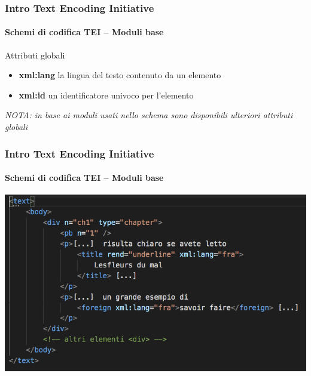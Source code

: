 \begin{frame}
	\frametitle{Intro Text Encoding Initiative}
	\framesubtitle{Schemi di codifica TEI – Moduli base}
	\addtocounter{nframe}{1}

    \begin{block}{ Attributi globali}
        \begin{itemize}
            \item \textbf{xml:lang} la lingua del testo contenuto da un elemento
            \item \textbf{xml:id} un identificatore univoco per l’elemento
        \end{itemize}
       \textit{NOTA: in base ai moduli usati nello schema sono disponibili ulteriori attributi globali}
    \end{block}
\end{frame}

\begin{frame}
	\frametitle{Intro Text Encoding Initiative}
	\framesubtitle{Schemi di codifica TEI – Moduli base}
	\addtocounter{nframe}{1}

	\begin{center}
		\includegraphics[width=.9\textwidth]{imgs/esempio-attr.png}
	\end{center}

\end{frame}


